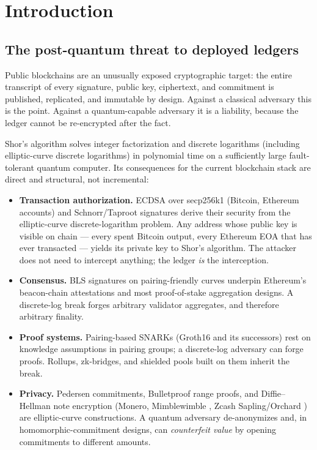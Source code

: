 \documentclass[11pt]{article}
\theoremstyle{plain}
\theoremstyle{definition}
\theoremstyle{remark}
\begin{document}
\tableofcontents

\section{Introduction}
\label{sec:intro}

\subsection{The post-quantum threat to deployed ledgers}
\label{sec:threat}

Public blockchains are an unusually exposed cryptographic target: the entire
transcript of every signature, public key, ciphertext, and commitment is
published, replicated, and immutable by design. Against a classical adversary
this is the point. Against a quantum-capable adversary it is a liability,
because the ledger cannot be re-encrypted after the fact.

Shor's algorithm \cite{shor1997} solves integer factorization and discrete
logarithms (including elliptic-curve discrete logarithms) in polynomial time on
a sufficiently large fault-tolerant quantum computer. Its consequences for the
current blockchain stack are direct and structural, not incremental:

\begin{itemize}[leftmargin=1.6em]
\item \textbf{Transaction authorization.} ECDSA over secp256k1 (Bitcoin,
  Ethereum accounts) and Schnorr/Taproot signatures derive their security from
  the elliptic-curve discrete-logarithm problem. Any address whose public key
  is visible on chain --- every spent Bitcoin output, every Ethereum EOA that
  has ever transacted --- yields its private key to Shor's algorithm. The
  attacker does not need to intercept anything; the ledger \emph{is} the
  interception.
\item \textbf{Consensus.} BLS signatures on pairing-friendly curves
  \cite{bls2003} underpin Ethereum's beacon-chain attestations and most
  proof-of-stake aggregation designs. A discrete-log break forges arbitrary
  validator aggregates, and therefore arbitrary finality.
\item \textbf{Proof systems.} Pairing-based SNARKs (Groth16 \cite{groth16} and
  its successors) rest on knowledge assumptions in pairing groups; a
  discrete-log adversary can forge proofs. Rollups, zk-bridges, and shielded
  pools built on them inherit the break.
\item \textbf{Privacy.} Pedersen commitments, Bulletproof range proofs, and
  Diffie--Hellman note encryption (Monero, Mimblewimble
  \cite{mimblewimble2016,poelstra2016}, Zcash Sapling/Orchard \cite{zcashspec})
  are elliptic-curve constructions. A quantum adversary de-anonymizes and, in
  homomorphic-commitment designs, can \emph{counterfeit value} by opening
  commitments to different amounts.
\end{itemize}
\end{document}
